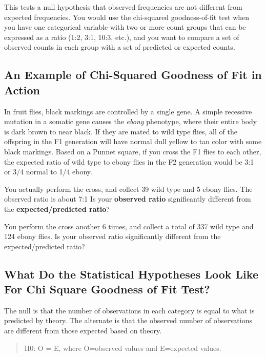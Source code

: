 \documentclass[
]{book}
\begin{document}
This tests a null hypothesis that observed frequencies are not different from expected frequencies. You would use the chi-squared goodness-of-fit test when you have one categorical variable with two or more count groups that can be expressed as a ratio (1:2, 3:1, 10:3, etc.), and you want to compare a set of observed counts in each group with a set of predicted or expected counts.

\hypertarget{an-example-of-chi-squared-goodness-of-fit-in-action}{%
\subsection{An Example of Chi-Squared Goodness of Fit in Action}\label{an-example-of-chi-squared-goodness-of-fit-in-action}}

In fruit flies, black markings are controlled by a single gene. A simple recessive mutation in a somatic gene causes the \emph{ebony} phenotype, where their entire body is dark brown to near black. If they are mated to wild type flies, all of the offspring in the F1 generation will have normal dull yellow to tan color with some black markings. Based on a Punnet square, if you cross the F1 flies to each other, the expected ratio of wild type to ebony flies in the F2 generation would be 3:1 or 3/4 normal to 1/4 ebony.

You actually perform the cross, and collect 39 wild type and 5 ebony flies. The observed ratio is about 7:1 Is your \textbf{observed ratio} significantly different from the \textbf{expected/predicted ratio}?

You perform the cross another 6 times, and collect a total of 337 wild type and 124 ebony flies. Is your observed ratio significantly different from the expected/predicted ratio?

\hypertarget{what-do-the-statistical-hypotheses-look-like-for-chi-square-goodness-of-fit-test}{%
\subsection{What Do the Statistical Hypotheses Look Like For Chi Square Goodness of Fit Test?}\label{what-do-the-statistical-hypotheses-look-like-for-chi-square-goodness-of-fit-test}}

The null is that the number of observations in each category is equal to what is predicted by theory. The alternate is that the observed number of observations are different from those expected based on theory.

\begin{quote}
H0: O = E, where O=observed values and E=expected values.
\end{quote}
\end{document}
